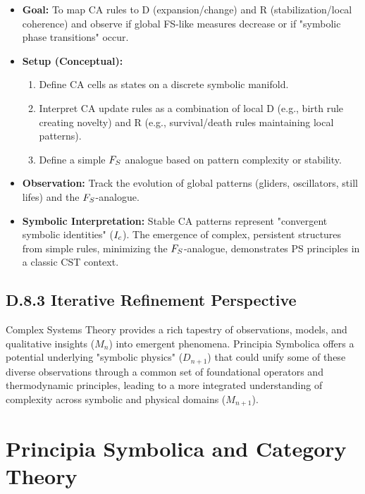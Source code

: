 \begin{itemize}
    \item \textbf{Goal:} To map CA rules to D (expansion/change) and R (stabilization/local coherence) and observe if global FS-like measures decrease or if "symbolic phase transitions" occur.
    \item \textbf{Setup (Conceptual):}
        \begin{enumerate}
            \item Define CA cells as states on a discrete symbolic manifold.
            \item Interpret CA update rules as a combination of local D (e.g., birth rule creating novelty) and R (e.g., survival/death rules maintaining local patterns).
            \item Define a simple \(F_S\) analogue based on pattern complexity or stability.
        \end{enumerate}
    \item \textbf{Observation:} Track the evolution of global patterns (gliders, oscillators, still lifes) and the \(F_S\)-analogue.
    \item \textbf{Symbolic Interpretation:} Stable CA patterns represent "convergent symbolic identities" (\(I_c\)). The emergence of complex, persistent structures from simple rules, minimizing the \(F_S\)-analogue, demonstrates PS principles in a classic CST context.
\end{itemize}
\subsection*{D.8.3 Iterative Refinement Perspective}
\label{subsec:appD_cst_iterative_refinement_perspective}
Complex Systems Theory provides a rich tapestry of observations, models, and qualitative insights (\(M_n\)) into emergent phenomena. Principia Symbolica offers a potential underlying "symbolic physics" (\(D_{n+1}\)) that could unify some of these diverse observations through a common set of foundational operators and thermodynamic principles, leading to a more integrated understanding of complexity across symbolic and physical domains (\(M_{n+1}\)).
\section*{Principia Symbolica and Category Theory} \label{sec:appD_ps_and_category_theory}
